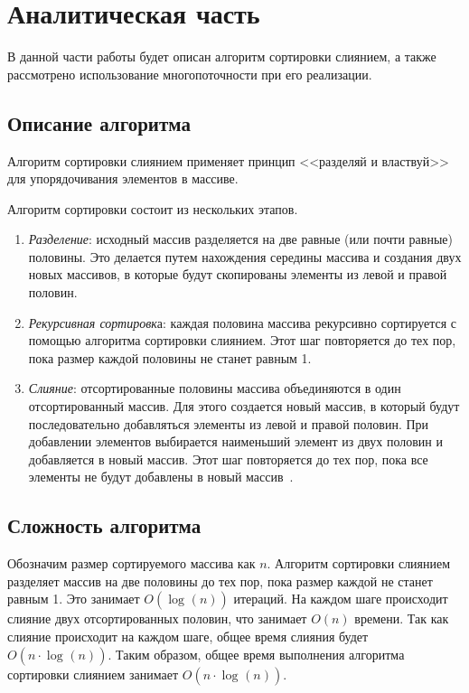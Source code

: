 \chapter{Аналитическая часть}
В данной части работы будет описан алгоритм сортировки слиянием, а также рассмотрено использование многопоточности при его реализации.

\section{Описание алгоритма}
Алгоритм сортировки слиянием применяет принцип <<разделяй и властвуй>> для упорядочивания элементов в массиве.

Алгоритм сортировки состоит из нескольких этапов.
\begin{enumerate}
	\item \textit{Разделение}: исходный массив разделяется на две равные (или почти равные) половины. Это делается путем нахождения середины массива и создания двух новых массивов, в которые будут скопированы элементы из левой и правой половин.
	
	\item\textit{ Рекурсивная сортировк}а: каждая половина массива рекурсивно сортируется с помощью алгоритма сортировки слиянием. Этот шаг повторяется до тех пор, пока размер каждой половины не станет равным 1.
	
	\item \textit{Слияние}: отсортированные половины массива объединяются в один отсортированный массив. Для этого создается новый массив, в который будут последовательно добавляться элементы из левой и правой половин. При добавлении элементов выбирается наименьший элемент из двух половин и добавляется в новый массив. Этот шаг повторяется до тех пор, пока все элементы не будут добавлены в новый массив~\cite{merge-sort}.
\end{enumerate}

\section{Сложность алгоритма}
Обозначим размер сортируемого массива как $n$. 
Алгоритм сортировки слиянием разделяет массив на две половины до тех пор, пока размер каждой не станет равным 1. 
Это занимает $O(\log_{}(n))$ итераций.
На каждом шаге происходит слияние двух отсортированных половин, что занимает $O(n)$ времени. 
Так как слияние происходит на каждом шаге, общее время слияния будет $O(n \cdot \log_{}(n))$.
Таким образом, общее время выполнения алгоритма сортировки слиянием занимает $O(n \cdot \log_{}(n))$.

